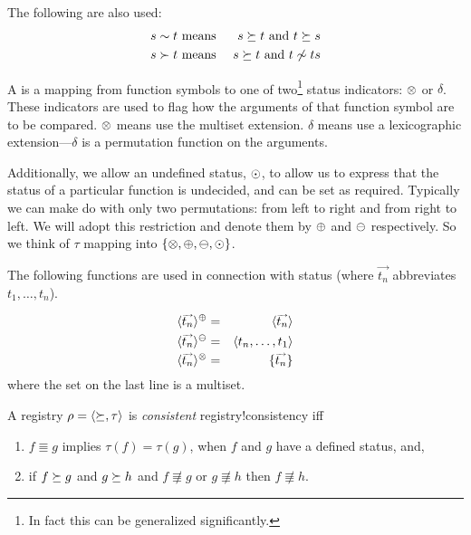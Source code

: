 The following are also used:
\begin{eqnarray}
s \sim t &\mbox{\ means\ }& s\succeq t \mbox{\ and\ } t\succeq s\\
s \succ t &\mbox{\ means\ }& s\succeq t \mbox{\ and\ } t\not\sim t s
\end{eqnarray}

A {\em {}\/} is a mapping from function symbols to one of
two\footnote {In fact this can be generalized significantly.} status
indicators: $\otimes$ or $\delta$.  These indicators are used to
flag how the arguments of that function symbol are to be compared.
$\otimes$ means use the multiset extension.  $\delta$ means use a
lexicographic extension---$\delta$ is a permutation function on the
arguments.  

Additionally, we allow an undefined status, $\Undef$, to allow us to
express that the status of a particular function is undecided, and can
be set as required.  Typically we can make do with only two
permutations: from left to right and from right to left.  We will
adopt this restriction and denote them by $\oplus$ and $\ominus$
respectively.  So we think of $\tau$ mapping into
$\{\otimes,\oplus,\ominus,\odot\}$.\index {$\Undef$}


The following functions are used in connection with status (where
$\vec{t_n}$ abbreviates $t_1,\ldots,t_n$).
\begin{defn}
\begin{eqnarray*}
\tuple{\vec{t_n}}^\Left&=&\tuple{\vec{t_n}}\\
\tuple{\vec{t_n}}^\Right&=&\tuple{t_n,\ldots,t_1}\\
\tuple{\vec{t_n}}^\Multi&=&\{\vec{t_n}\}
\end{eqnarray*}
where the set on the last line is a multiset.
\end{defn}

\begin{defn}[Consistency]
A registry $\rho=\langle \succeq,\tau\rangle$ is \emph{consistent}\index
{registry!consistency} iff
\begin{enumerate}
\item $f\Equiv g$ implies $\tau(f)=\tau(g)$, when $f$ and $g$ have a
defined status, and,
\item if $f\succeq g$ and $g \succeq h$ and $f\not\Equiv g$ or
$g\not\Equiv h$ then $f\not\Equiv h$.
\end{enumerate}
\end{defn}



